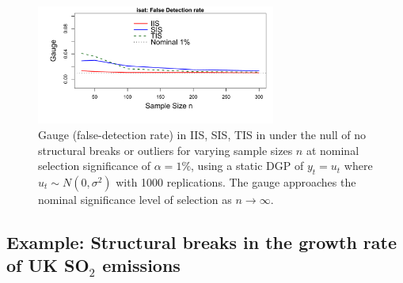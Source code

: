 \documentclass[article,nojss]{jss}
\begin{document}
\begin{figure}[t!]
  \centering
    \includegraphics[width=0.7\textwidth, trim = 0 25 0 5, clip]{fig_isat_performance_v2.pdf}
  \caption{Gauge (false-detection rate) in IIS, SIS, TIS in
     under the null of no structural breaks or outliers for
    varying sample sizes $n$ at nominal selection significance of
    $\alpha=1\%$, using a static DGP of $y_t=u_t$ where
    $u_t \sim N(0, \sigma^2)$ with 1000 replications. The gauge
    approaches the nominal significance level of selection as
    $n \rightarrow \infty$. \label{fig_isat} }
\end{figure}
\subsection{Example: Structural breaks in the growth rate of UK SO$_2$ emissions}
\end{document}
